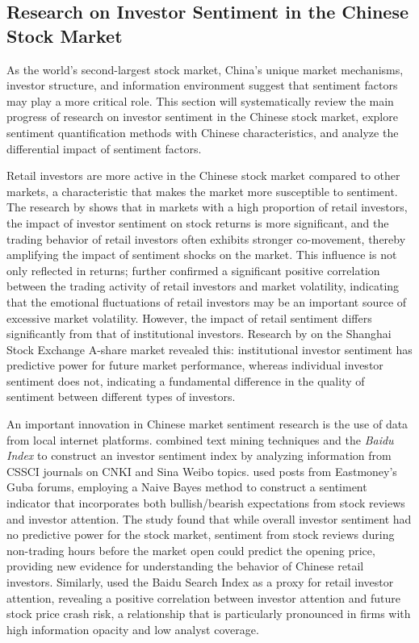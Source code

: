 \documentclass[AER]{AEA}
\begin{document}
\subsection{Research on Investor Sentiment in the Chinese Stock Market}

As the world's second-largest stock market, China's unique market mechanisms, investor structure, and information environment suggest that sentiment factors may play a more critical role. This section will systematically review the main progress of research on investor sentiment in the Chinese stock market, explore sentiment quantification methods with Chinese characteristics, and analyze the differential impact of sentiment factors.

Retail investors are more active in the Chinese stock market compared to other markets, a characteristic that makes the market more susceptible to sentiment. The research by \citet{kumar2006retail} shows that in markets with a high proportion of retail investors, the impact of investor sentiment on stock returns is more significant, and the trading behavior of retail investors often exhibits stronger co-movement, thereby amplifying the impact of sentiment shocks on the market. This influence is not only reflected in returns; \citet{foucault2011individual} further confirmed a significant positive correlation between the trading activity of retail investors and market volatility, indicating that the emotional fluctuations of retail investors may be an important source of excessive market volatility.
However, the impact of retail sentiment differs significantly from that of institutional investors. Research by \citet{JCYJ201403008} on the Shanghai Stock Exchange A-share market revealed this: institutional investor sentiment has predictive power for future market performance, whereas individual investor sentiment does not, indicating a fundamental difference in the quality of sentiment between different types of investors.

An important innovation in Chinese market sentiment research is the use of data from local internet platforms. \citet{JJGA201601015} combined text mining techniques and the \textit{Baidu Index} to construct an investor sentiment index by analyzing information from CSSCI journals on CNKI and Sina Weibo topics. \citet{JCYJ201804005} used posts from Eastmoney's Guba forums, employing a Naive Bayes method to construct a sentiment indicator that incorporates both bullish/bearish expectations from stock reviews and investor attention. The study found that while overall investor sentiment had no predictive power for the stock market, sentiment from stock reviews during non-trading hours before the market open could predict the opening price, providing new evidence for understanding the behavior of Chinese retail investors. Similarly, \citet{wen2019retail} used the Baidu Search Index as a proxy for retail investor attention, revealing a positive correlation between investor attention and future stock price crash risk, a relationship that is particularly pronounced in firms with high information opacity and low analyst coverage.
\end{document}
